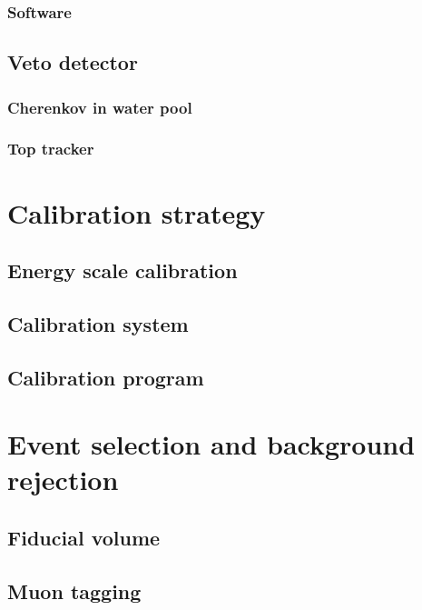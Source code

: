 \subsubsection{Software}



\subsection{Veto detector}

\subsubsection{Cherenkov in water pool}

\subsubsection{Top tracker}

\section{Calibration strategy}

\subsection{Energy scale calibration}

\subsection{Calibration system}

\subsection{Calibration program}

\section{Event selection and background rejection}


\subsection{Fiducial volume}

\subsection{Muon tagging}

